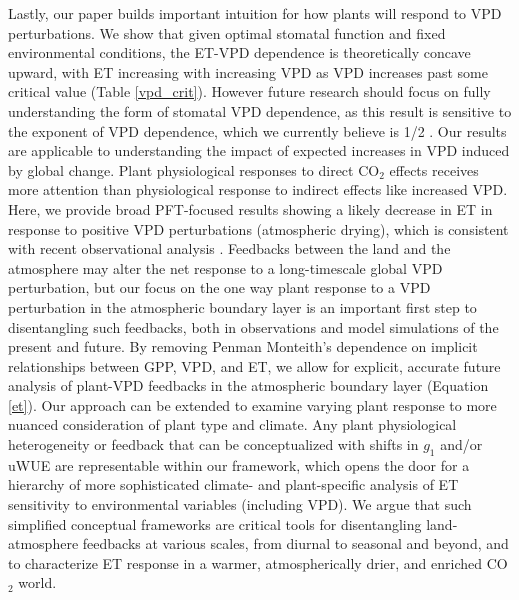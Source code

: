 Lastly, our paper builds important intuition for how plants will
respond to VPD perturbations. We show that given optimal stomatal
function and fixed environmental conditions, the ET-VPD dependence is
theoretically concave upward, with ET increasing with increasing VPD as
VPD increases past some critical value (Table \ref{vpd_crit}). However
future research should focus on fully understanding the form of
stomatal VPD dependence, as this result is sensitive to the exponent of
VPD dependence, which we currently believe is 1/2 \citep{MEDLYN_2011,
  Zhou_2014}. Our results are applicable to understanding the impact
of  expected increases in VPD
induced by global change.  Plant physiological responses to direct
CO$_2$ effects \citep[e.g.,][]{Swann_2016, Lemordant_2018} receives more attention
than physiological response to indirect effects like increased
VPD. Here, we provide broad PFT-focused results showing a likely
decrease in ET in response to positive VPD perturbations (atmospheric
drying), which is consistent with recent observational analysis
\citep[e.g.,][]{Rigden_2017}. Feedbacks between the land and the
atmosphere may alter the net response to a long-timescale global VPD perturbation,
but our focus on the one way plant response to a VPD perturbation in
the atmospheric boundary layer is an important first step to
disentangling such feedbacks, both in observations and model
simulations of the present and future. By removing Penman Monteith's
dependence on implicit relationships between GPP, VPD, and ET, we
allow for explicit, accurate future analysis of plant-VPD feedbacks
in the atmospheric boundary layer (Equation \ref{et}). Our approach
can be extended to examine varying plant response to more nuanced
consideration of plant type and climate. Any plant physiological
heterogeneity or feedback that can be conceptualized with shifts in $g_1$
\citep[e.g.][]{Lin_2015, Medlyn_2017} and/or uWUE
\citep[e.g.][]{Zhou_2014} are representable within our framework, which
opens the door for a hierarchy of more sophisticated climate- and
plant-specific analysis of ET sensitivity to environmental variables
(including VPD). We argue that such simplified conceptual frameworks
are critical tools for disentangling land-atmosphere feedbacks at
various scales, from diurnal to seasonal and beyond, and to
characterize ET response in a warmer, atmospherically drier, and
enriched CO$_2$ world.

